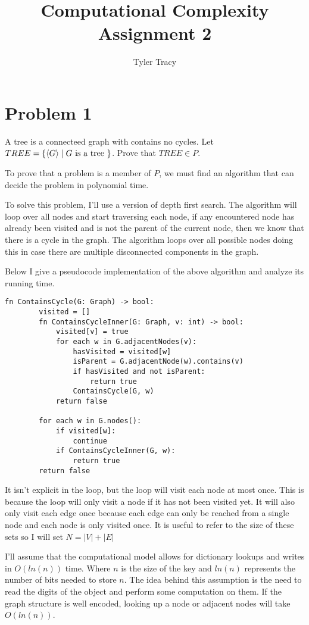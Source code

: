 \documentclass[12pt]{article}
\title{Computational Complexity Assignment 2}
\author{Tyler Tracy}
\begin{document}
\section*{Problem 1}

\begin{questionbox}
	A tree is a connecteed graph with contains no cycles. Let $TREE = \{ \braket{G} \mid G \text{ is a tree } \}$. Prove that $TREE \in P$.
\end{questionbox}

To prove that a problem is a member of $P$, we must find an algorithm that can decide the problem in polynomial time.

To solve this problem, I'll use a version of depth first search. The algorithm will loop over all nodes and start traversing each node, if any encountered node has already been visited and is not the parent of the current node, then we know that there is a cycle in the graph. The algorithm loops over all possible nodes doing this in case there are multiple disconnected components in the graph.

Below I give a pseudocode implementation of the above algorithm and analyze its running time.

\begin{lstlisting}[basicstyle=\small, tabsize=3]
	fn ContainsCycle(G: Graph) -> bool:
		visited = []
		fn ContainsCycleInner(G: Graph, v: int) -> bool:
			visited[v] = true
			for each w in G.adjacentNodes(v):
				hasVisited = visited[w]
				isParent = G.adjacentNode(w).contains(v)
				if hasVisited and not isParent:
					return true
				ContainsCycle(G, w)
			return false

		for each w in G.nodes():
			if visited[w]:
				continue
			if ContainsCycleInner(G, w):
				return true
		return false
\end{lstlisting}

It isn't explicit in the loop, but the loop will visit each node at most once. This is because the loop will only visit a node if it has not been visited yet. It will also only visit each edge once because each edge can only be reached from a single node and each node is only visited once. It is useful to refer to the size of these sets so I will set $N = |V| + |E|$

I'll assume that the computational model allows for dictionary lookups and writes in $O(ln(n))$ time. Where $n$ is the size of the key and $ln(n)$ represents the number of bits needed to store $n$. The idea behind this assumption is the need to read the digits of the object and perform some computation on them. If the graph structure is well encoded, looking up a node or adjacent nodes will take $O(ln(n))$.
\end{document}
